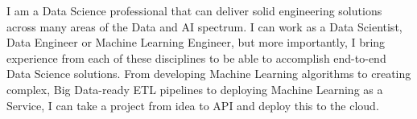 I am a Data Science professional that can deliver solid engineering solutions across
many areas of the Data and AI spectrum. I can work as a Data Scientist,
Data Engineer or Machine Learning Engineer, but more importantly, I bring experience
from each of these disciplines to be able to accomplish end-to-end Data Science solutions.
From developing Machine Learning algorithms to creating complex, Big Data-ready ETL
pipelines to deploying Machine Learning as a Service, I can take a project from idea to
API and deploy this to the cloud.

